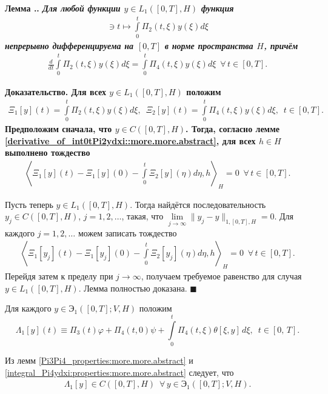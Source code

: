 \documentclass{report}
\newcounter{lem}[section]
\renewcommand{\thelem}{\thesection.\arabic{lem}}
\newenvironment{Lemma}{\par\refstepcounter{lem}\bf Лемма \thelem. \it}{\rm\par}
\newenvironment{Proof}{\par\noindent\bf Доказательство.\rm}{ $\blacksquare$\par}
\begin{document}
\begin{Lemma}\label{derivative_of_int0tPi2ydxi:more.more.abstract}
Для любой функции $y\in L_1([0,T],H)$ функция
\begin{gather*}
[0,T]\ni t\mapsto\int\limits_0^t\Pi_2(t,\xi)y(\xi)d\xi
\end{gather*}
непрерывно дифференцируема на $[0,T]$ в норме пространства $H$, причём
\begin{gather*}
\frac{d}{dt}\int\limits_0^t\Pi_2(t,\xi)y(\xi)d\xi=\int\limits_0^t\Pi_4(t,\xi)y(\xi)d\xi\,\,\,\forall\,t\in[0,T].
\end{gather*}
\end{Lemma}
\begin{Proof}
Для всех $y\in L_1([0,T],H)$ положим
\begin{gather*}
\Xi_1[y](t)=\int\limits_0^t\Pi_2(t,\xi)y(\xi)d\xi,\,\,\,\Xi_2[y](t)=\int\limits_0^t\Pi_4(t,\xi)y(\xi)d\xi,\,\,\,t\in[0,T].
\end{gather*}
Предположим сначала, что $y\in C([0,T],H)$. Тогда, согласно лемме \ref{derivative_of_int0tPi2ydxi::more.more.abstract}, для всех $h\in H$ выполнено тождество
\begin{gather*}%
\left\langle\Xi_1[y](t)-\Xi_1[y](0)-\int\limits_0^t\Xi_2[y](\eta)d\eta,h\right\rangle_H=0\,\,\,\forall\,t\in[0,T].
\end{gather*}

Пусть теперь $y\in L_1([0,T],H)$. Тогда найдётся последовательность $y_j\in C([0,T],H)$, $j=1,2,\dots$, такая, что $\lim\limits_{j\to\infty}\|y_j-y\|_{1,[0,T],H}=0$. Для каждого
$j=1,2,\dots$ можем записать тождество
\begin{gather*}%
\left\langle\Xi_1[y_j](t)-\Xi_1[y_j](0)-\int\limits_0^t\Xi_2[y_j](\eta)d\eta,h\right\rangle_H=0\,\,\,\forall\,t\in[0,T].
\end{gather*}
Перейдя затем к пределу при $j\to\infty$, получаем требуемое равенство для случая $y\in L_1([0,T],H)$. Лемма полностью доказана.
\end{Proof}

Для каждого $y\in{\textbf{Э}}_1([0,T];V,H)$ положим
\begin{equation*}
\Lambda_1[y](t)\equiv\Pi_3(t)\varphi+\Pi_4(t,0)\psi+ \int\limits_{0}^{t}\Pi_4(t,\xi)\theta[\xi,y]\,d\xi,\,\,\,t\in[0,\,T].
\end{equation*}

Из лемм \ref{Pi3Pi4_properties:more.more.abstract} и \ref{integral_Pi4ydxi:properties:more.more.abstract} следует, что
\begin{gather*}
\Lambda_1[y]\in C([0,T],H)\,\,\,\forall\,y\in{\textbf{Э}}_1([0,T];V,H).
\end{gather*}
\end{document}
